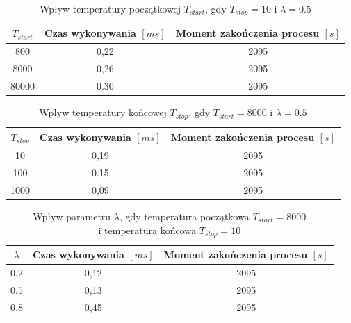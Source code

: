 \begin{table}[H]
	\centering
	\caption{Wpływ temperatury początkowej $T_{start}$, gdy $T_{stop}=10$ i $\lambda=0.5$}
	\label{tstart_sa_3}
	\begin{tabular}{ccc}
		\toprule
		$T_{start}$ & Czas wykonywania $[ms]$ & Moment zakończenia procesu $[s]$ \\
		\midrule
		800         & 0,22                    & 2095                              \\
		8000        & 0,26                    & 2095                              \\
		80000       & 0.30                    & 2095                              \\
		\bottomrule
	\end{tabular}
\end{table}
\breakparagraph{}
\begin{table}[H]
	\centering
	\label{tstop_sa_3}
	\caption{Wpływ temperatury końcowej $T_{stop}$, gdy $T_{start}=8000$ i $\lambda=0.5$}
	\begin{tabular}{ccc}
		\toprule
		$T_{stop}$ & Czas wykonywania $[ms]$ & Moment zakończenia procesu $[s]$ \\
		\midrule
		10         & 0,19                    & 2095                              \\
		100        & 0.15                    & 2095                              \\
		1000       & 0,09                    & 2095                              \\
		\bottomrule
	\end{tabular}
\end{table}
\breakparagraph{}
\begin{table}[H]
	\centering
	\caption{Wpływ parametru $\lambda$, gdy temperatura początkowa $T_{start}=8000$\\i temperatura końcowa $T_{stop}=10$}
	\label{lamda_sa_3}
	\begin{tabular}{ccc}
		\toprule
		$\lambda$ & Czas wykonywania $[ms]$ & Moment zakończenia procesu $[s]$ \\
		\midrule
		$0.2$     & 0,12                    & 2095                              \\
		$0.5$     & 0,13                    & 2095                              \\
		$0.8$     & 0,45                    & 2095                              \\
		\bottomrule
	\end{tabular}
\end{table}

